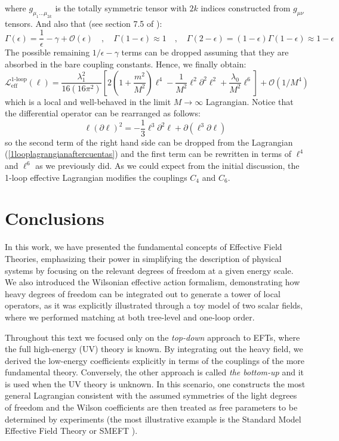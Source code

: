 \documentclass[11pt]{article}
\begin{document}
where $g_{\mu_1 \dots \mu_{2k}}$ is the totally symmetric tensor with $2k$ indices constructed from $g_{\mu\nu}$ tensors. And also that (see section 7.5 of \cite{Peskin:1995ev}):
\begin{equation}
    \Gamma(\epsilon)=\dfrac{1}{\epsilon}-\gamma+\mathcal{O}(\epsilon)\quad,\quad  \Gamma(1-\epsilon)\approx1 \quad,\quad \Gamma(2-\epsilon)=(1-\epsilon)\Gamma(1-\epsilon)\approx1-\epsilon
\end{equation}
The possible remaining ${1}/{\epsilon}-\gamma$ terms can be dropped assuming that they are absorbed in the bare coupling constants. Hence, we finally obtain:
\begin{equation}\label{1looplagrangianaftercuentas}
    \mathcal{L}_{\text{eff}}^{\text{1-loop}}(\ell)=\dfrac{\lambda_1^2}{16(16\pi^2)}\left[2\left(1+\dfrac{m^2}{M^2}\right)\ell^4-\dfrac{1}{M^2}\ell^2\partial^2\ell^2+\dfrac{\lambda_0}{M^2}\ell^6  \right]+\mathcal{O}(1/M^4)
\end{equation}
which is a local and well-behaved in the limit $M\to \infty$ Lagrangian. Notice that the differential operator can be rearranged as follows:
\begin{equation}
    \ell(\partial\ell)^2=-\dfrac{1}{3}\ell^3\partial^2\ell+\partial(\ell^3\partial\ell)
\end{equation}
so the second term of the right hand side can be dropped from the Lagrangian (\ref{1looplagrangianaftercuentas}) and the first term can be rewritten in terms of $\ell^4$ and $\ell^6$ as we previously did. As we could expect from the initial discussion, the 1-loop effective Lagrangian modifies the couplings $C_4$ and $C_6$.
\section{Conclusions}
In this work, we have presented the fundamental concepts of Effective Field Theories, emphasizing their power in simplifying the description of physical systems by focusing on the relevant degrees of freedom at a given energy scale. We also introduced the Wilsonian effective action formalism, demonstrating how heavy degrees of freedom can be integrated out to generate a tower of local operators, as it was explicitly illustrated through a toy model of two scalar fields, where we performed matching at both tree-level and one-loop order.

Throughout this text we focused only on the \textit{top-down} approach to EFTs, where the full high-energy (UV) theory is known. By integrating out the heavy field, we derived the low-energy coefficients explicitly in terms of the couplings of the more fundamental theory. Conversely, the other approach is called \textit{the bottom-up} and it is used when the UV theory is unknown. In this scenario, one constructs the most general Lagrangian consistent with the assumed symmetries of the light degrees of freedom and the Wilson coefficients are then treated as free parameters to be determined by experiments (the most illustrative example is the Standard Model Effective Field Theory or SMEFT \cite{manohar2018introductioneffectivefieldtheories, Burgess_2007, Falkowski,Fuentes_Mart_n_2016}). 
\end{document}
